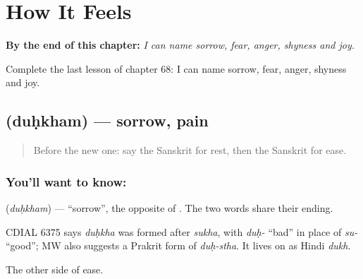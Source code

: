 
\chapter{How It Feels}
\label{ch:sa-how-it-feels}

\begin{chapteropening}
\textbf{By the end of this chapter:} \emph{I can name sorrow, fear, anger, shyness and joy.}

Complete the last lesson of chapter 68: I can name sorrow, fear, anger, shyness and joy.
\end{chapteropening}

\section[\texorpdfstring{\sk{दुःखम्} (duḥkham)}{दुःखम् (duḥkham)}]{ (duḥkham) — sorrow, pain}

\label{lesson:SA-C68-sorrow}



\begin{quote}
Before the new one: say the Sanskrit for rest, then the Sanskrit for ease.
\end{quote}

\subsection*{You'll want to know: }
\textbf{} (\emph{duḥkham}) — \textquotedblleft{}sorrow\textquotedblright{}, the opposite of \textbf{}. The two words share their ending.

\begin{cousinweb}
CDIAL 6375 says \emph{duḥkha} was formed after \emph{sukha}, with \emph{duḥ-} \textquotedblleft{}bad\textquotedblright{} in place of \emph{su-} \textquotedblleft{}good\textquotedblright{}; MW also suggests a Prakrit form of \emph{duḥ-stha}. It lives on as Hindi \emph{dukh}.
\end{cousinweb}

\begin{grammarlens}[title={What you've built}]
The other side of ease.
\end{grammarlens}

